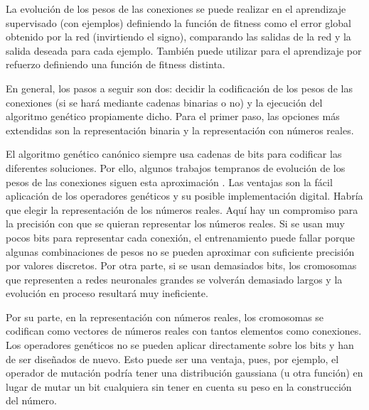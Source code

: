 \documentclass[11pt]{article}
\begin{document}
\begin{titlepage}
 La evoluci\'on de los pesos de las conexiones se puede realizar en el aprendizaje supervisado (con ejemplos) definiendo la funci\'on de fitness como el error global obtenido por la red (invirtiendo el signo), comparando las salidas de la red y la salida deseada para cada ejemplo. Tambi\'en puede utilizar para el aprendizaje por refuerzo definiendo una funci\'on de fitness distinta.

 En general, los pasos a seguir son dos: decidir la codificaci\'on de los pesos de las conexiones (si se har\'a mediante cadenas binarias o no) y la ejecuci\'on del algoritmo gen\'etico propiamente dicho. Para el primer paso, las opciones m\'as extendidas son la representaci\'on binaria y la representaci\'on con n\'umeros reales.

   El algoritmo gen\'etico can\'onico siempre usa cadenas de bits para codificar las diferentes soluciones. Por ello, algunos trabajos tempranos de evoluci\'on de los pesos de las conexiones siguen esta aproximaci\'on \cite[Yao99]{Yao99}. Las ventajas son la f\'acil aplicaci\'on de los operadores gen\'eticos y su posible implementaci\'on digital. Habr\'ia que elegir la representaci\'on de los n\'umeros reales. Aqu\'i hay un compromiso para la precisi\'on con que se quieran representar los n\'umeros reales. Si se usan muy pocos bits para representar cada conexi\'on, el entrenamiento puede fallar porque algunas combinaciones de pesos no se pueden aproximar con suficiente precisi\'on por valores discretos. Por otra parte, si se usan demasiados bits, los cromosomas que representen a redes neuronales grandes se volver\'an demasiado largos y la evoluci\'on en proceso resultar\'a muy ineficiente.

 Por su parte, en la representaci\'on con n\'umeros reales, los cromosomas se codifican como vectores de n\'umeros reales con tantos elementos como conexiones. Los operadores gen\'eticos no se pueden aplicar directamente sobre los bits y han de ser dise\~nados de nuevo. Esto puede ser una ventaja, pues, por ejemplo, el operador de mutaci\'on podr\'ia tener una distribuci\'on gaussiana (u otra funci\'on) en lugar de mutar un bit cualquiera sin tener en cuenta su peso en la construcci\'on del n\'umero.


\end{titlepage}
\end{document}
